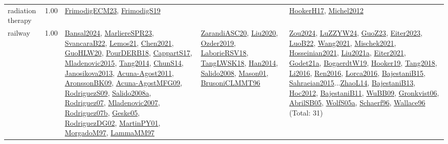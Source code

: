 {\begin{longtable}{p{3cm}r>{\raggedright\arraybackslash}p{6cm}>{\raggedright\arraybackslash}p{6cm}>{\raggedright\arraybackslash}p{8cm}}
\index{radiation therapy}\index{ApplicationAreas!radiation therapy}radiation therapy &  1.00 & \hyperref[detail:FrimodigECM23]{FrimodigECM23}, \hyperref[detail:FrimodigS19]{FrimodigS19} &  & \hyperref[detail:HookerH17]{HookerH17}, \hyperref[detail:Michel2012]{Michel2012}\\
\index{railway}\index{ApplicationAreas!railway}railway &  1.00 & \hyperref[detail:Bansal2024]{Bansal2024}, \hyperref[detail:MarliereSPR23]{MarliereSPR23}, \hyperref[detail:SvancaraB22]{SvancaraB22}, \hyperref[detail:Lemos21]{Lemos21}, \hyperref[detail:Chen2021]{Chen2021}, \hyperref[detail:GuoHLW20]{GuoHLW20}, \hyperref[detail:PourDERB18]{PourDERB18}, \hyperref[detail:CappartS17]{CappartS17}, \hyperref[detail:Mladenovic2015]{Mladenovic2015}, \hyperref[detail:Tang2014]{Tang2014}, \hyperref[detail:ChunS14]{ChunS14}, \hyperref[detail:Janosikova2013]{Janosikova2013}, \hyperref[detail:Acuna-Agost2011]{Acuna-Agost2011}, \hyperref[detail:AronssonBK09]{AronssonBK09}, \hyperref[detail:Acuna-AgostMFG09]{Acuna-AgostMFG09}, \hyperref[detail:RodriguezS09]{RodriguezS09}, \hyperref[detail:Salido2008a]{Salido2008a}, \hyperref[detail:Rodriguez07]{Rodriguez07}, \hyperref[detail:Mladenovic2007]{Mladenovic2007}, \hyperref[detail:Rodriguez07b]{Rodriguez07b}, \hyperref[detail:Geske05]{Geske05}, \hyperref[detail:RodriguezDG02]{RodriguezDG02}, \hyperref[detail:MartinPY01]{MartinPY01}, \hyperref[detail:MorgadoM97]{MorgadoM97}, \hyperref[detail:LammaMM97]{LammaMM97} & \hyperref[detail:ZarandiASC20]{ZarandiASC20}, \hyperref[detail:Liu2020]{Liu2020}, \hyperref[detail:Ozder2019]{Ozder2019}, \hyperref[detail:LaborieRSV18]{LaborieRSV18}, \hyperref[detail:TangLWSK18]{TangLWSK18}, \hyperref[detail:Han2014]{Han2014}, \hyperref[detail:Salido2008]{Salido2008}, \hyperref[detail:Mason01]{Mason01}, \hyperref[detail:BrusoniCLMMT96]{BrusoniCLMMT96} & \hyperref[detail:Zou2024]{Zou2024}, \hyperref[detail:LuZZYW24]{LuZZYW24}, \hyperref[detail:GuoZ23]{GuoZ23}, \hyperref[detail:Eiter2023]{Eiter2023}, \hyperref[detail:LuoB22]{LuoB22}, \hyperref[detail:Wang2021]{Wang2021}, \hyperref[detail:Mischek2021]{Mischek2021}, \hyperref[detail:Hosseinian2021]{Hosseinian2021}, \hyperref[detail:Liu2021a]{Liu2021a}, \hyperref[detail:Eiter2021]{Eiter2021}, \hyperref[detail:Godet21a]{Godet21a}, \hyperref[detail:BogaerdtW19]{BogaerdtW19}, \hyperref[detail:Hooker19]{Hooker19}, \hyperref[detail:Tang2018]{Tang2018}, \hyperref[detail:Li2016]{Li2016}, \hyperref[detail:Ren2016]{Ren2016}, \hyperref[detail:Lorca2016]{Lorca2016}, \hyperref[detail:BajestaniB15]{BajestaniB15}, \hyperref[detail:Sahraeian2015]{Sahraeian2015}...\hyperref[detail:ZhaoL14]{ZhaoL14}, \hyperref[detail:BajestaniB13]{BajestaniB13}, \hyperref[detail:Hoc2012]{Hoc2012}, \hyperref[detail:BajestaniB11]{BajestaniB11}, \hyperref[detail:WuBB09]{WuBB09}, \hyperref[detail:Gronkvist06]{Gronkvist06}, \hyperref[detail:AbrilSB05]{AbrilSB05}, \hyperref[detail:WolfS05a]{WolfS05a}, \hyperref[detail:Schaerf96]{Schaerf96}, \hyperref[detail:Wallace96]{Wallace96} (Total: 31)\\

\end{longtable}}
